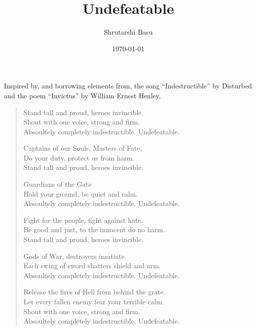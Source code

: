 \documentclass[11pt,letterpaper]{article}
\title{Undefeatable}
\author{Shrutarshi Basu}
\date{\today}
\begin{document}
\maketitle

\begin{center}
\begin{boxedminipage}{0.55\textwidth}
Inspired by, and borrowing elements from, the song ``Indestructible'' by Disturbed and the poem ``Invictus'' by William Ernest Henley.
\end{boxedminipage}
\end{center}

\begin{verse}
Stand tall and proud, heroes invincible.\\
Shout with one voice, strong and firm.\\
Absoultely completely indestructible. Undefeatable.

Captains of our Souls, Masters of Fate,\\
Do your duty, protect us from harm.\\
Stand tall and proud, heroes invincible.

Guardians of the Gate\\
Hold your ground, be quiet and calm.\\
Absoultely completely indestructible. Undefeatable.

Fight for the people, fight against hate.\\
Be good and just, to the innocent do no harm.\\
Stand tall and proud, heroes invincible.

Gods of War, destroyers insatiate.\\
Each swing of sword shatters shield and arm.\\
Absoultely completely indestructible. Undefeatable.

Release the fires of Hell from behind the grate.\\
Let every fallen enemy fear your terrible calm.\\
Shout with one voice, strong and firm.\\
Absoultely completely indestructible. Undefeatable.

\end{verse}

\begin{center}

\end{center}
\end{document}
